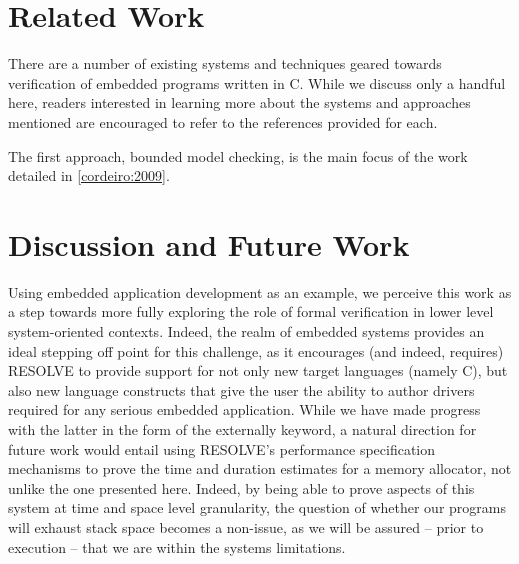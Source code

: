 \section{Related Work}

There are a number of existing systems and techniques geared towards verification of embedded programs written in C. While we discuss only a handful here, readers interested in learning more about the systems and approaches mentioned are encouraged to refer to the references provided for each. 

The first approach, bounded model checking, is the main focus of the work detailed in \ref{cordeiro:2009}. 






\section{Discussion and Future Work}

Using embedded application development as an example, we perceive this work as a step towards more fully exploring the role of formal verification in lower level system-oriented contexts. Indeed, the realm of embedded systems provides an ideal stepping off point for this challenge, as it encourages (and indeed, requires) RESOLVE to provide support for not only new target languages (namely C), but also new language constructs that give the user the ability to author drivers required for any serious embedded application. While we have made progress with the latter in the form of the externally keyword, a natural direction for future work would entail using RESOLVE's performance specification mechanisms to prove the time and duration estimates for a memory allocator, not unlike the one presented here. Indeed, by being able to prove aspects of this system at time and space level granularity, the question of whether our programs will exhaust stack space becomes a non-issue, as we will be assured -- prior to execution -- that we are within the systems limitations.

